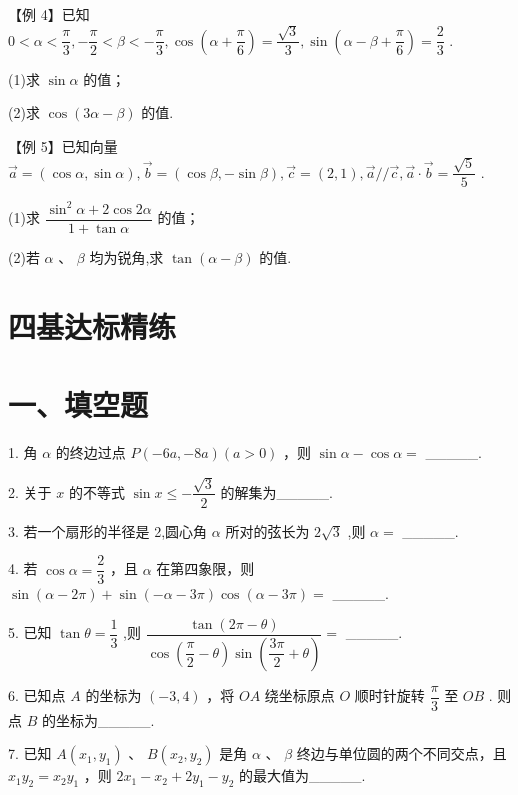 【例 4】已知 $0 < \alpha  < \dfrac{\pi }{3}, - \dfrac{\pi }{2} < \beta  <  - \dfrac{\pi }{3},\cos \left( {\alpha  + \dfrac{\pi }{6}}\right)  = \dfrac{\sqrt{3}}{3},\sin \left( {\alpha  - \beta  + \dfrac{\pi }{6}}\right)  = \dfrac{2}{3}$ .

(1)求 $\sin \alpha$ 的值；

(2)求 $\cos \left( {{3\alpha } - \beta }\right)$ 的值.

【例 5】已知向量 $\overrightarrow{a} = \left( {\cos \alpha ,\sin \alpha }\right) ,\overrightarrow{b} = \left( {\cos \beta , - \sin \beta }\right) ,\overrightarrow{c} = \left( {2,1}\right) ,\overrightarrow{a}//\overrightarrow{c},\overrightarrow{a} \cdot  \overrightarrow{b} = \dfrac{\sqrt{5}}{5}$ .

(1)求 $\dfrac{{\sin }^{2}\alpha  + 2\cos {2\alpha }}{1 + \tan \alpha }$ 的值；

(2)若 $\alpha$ 、 $\beta$ 均为锐角,求 $\tan \left( {\alpha  - \beta }\right)$ 的值.

\section*{四基达标精练}

\section*{一、填空题}

1. 角 $\alpha$ 的终边过点 $P\left( {-{6a}, - {8a}}\right) \left( {a > 0}\right)$ ，则 $\sin \alpha  - \cos \alpha  =$ \_\_\_\_\_.

2. 关于 $x$ 的不等式 $\sin x \leq   - \dfrac{\sqrt{3}}{2}$ 的解集为\_\_\_\_\_.

3. 若一个扇形的半径是 2,圆心角 $\alpha$ 所对的弦长为 $2\sqrt{3}$ ,则 $\alpha  =$ \_\_\_\_\_.

4. 若 $\cos \alpha  = \dfrac{2}{3}$ ，且 $\alpha$ 在第四象限，则 $\sin \left( {\alpha  - {2\pi }}\right)  + \sin \left( {-\alpha  - {3\pi }}\right) \cos \left( {\alpha  - {3\pi }}\right)  =$ \_\_\_\_\_.

5. 已知 $\tan \theta  = \dfrac{1}{3}$ ,则 $\dfrac{\tan \left( {{2\pi } - \theta }\right) }{\cos \left( {\dfrac{\pi }{2} - \theta }\right) \sin \left( {\dfrac{3\pi }{2} + \theta }\right) } =$ \_\_\_\_\_.

6. 已知点 $A$ 的坐标为 $\left( {-3,4}\right)$ ，将 ${OA}$ 绕坐标原点 $O$ 顺时针旋转 $\dfrac{\pi }{3}$ 至 ${OB}$ . 则点 $B$ 的坐标为\_\_\_\_\_.

7. 已知 $A\left( {{x}_{1},{y}_{1}}\right)$ 、 $B\left( {{x}_{2},{y}_{2}}\right)$ 是角 $\alpha$ 、 $\beta$ 终边与单位圆的两个不同交点，且 ${x}_{1}{y}_{2} = {x}_{2}{y}_{1}$ ，则 $2{x}_{1} - {x}_{2} +  2{y}_{1} - {y}_{2}$ 的最大值为\_\_\_\_\_.

